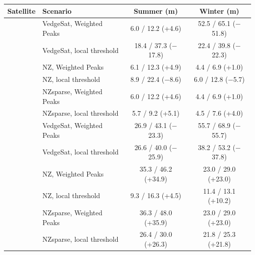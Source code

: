 \begin{tabular}{llcc}
\toprule
Satellite & Scenario & Summer (m) & Winter (m) \\
\midrule
{} & VedgeSat, Weighted Peaks & 6.0 / 12.2 (+4.6) & 52.5 / 65.1 ($-$51.8) \\
 & VedgeSat, local threshold & 18.4 / 37.3 ($-$17.8) & 22.4 / 39.8 ($-$22.3) \\
 & NZ, Weighted Peaks & 6.1 / 12.3 (+4.9) & 4.4 / 6.9 (+1.0) \\
 & NZ, local threshold & 8.9 / 22.4 ($-$8.6) & 6.0 / 12.8 ($-$5.7) \\
 & NZsparse, Weighted Peaks & 6.0 / 12.2 (+4.6) & 4.4 / 6.9 (+1.0) \\
 & NZsparse, local threshold & 5.7 / 9.2 (+5.1) & 4.5 / 7.6 (+4.0) \\
\midrule
{} & VedgeSat, Weighted Peaks & 26.9 / 43.1 ($-$23.3) & 55.7 / 68.9 ($-$55.7) \\
 & VedgeSat, local threshold & 26.6 / 40.0 ($-$25.9) & 38.2 / 53.2 ($-$37.8) \\
 & NZ, Weighted Peaks & 35.3 / 46.2 (+34.9) & 23.0 / 29.0 (+23.0) \\
 & NZ, local threshold & 9.3 / 16.3 (+4.5) & 11.4 / 13.1 (+10.2) \\
 & NZsparse, Weighted Peaks & 36.3 / 48.0 (+35.9) & 23.0 / 29.0 (+23.0) \\
 & NZsparse, local threshold & 26.4 / 30.0 (+26.3) & 21.8 / 25.3 (+21.8) \\
\bottomrule
\end{tabular}
